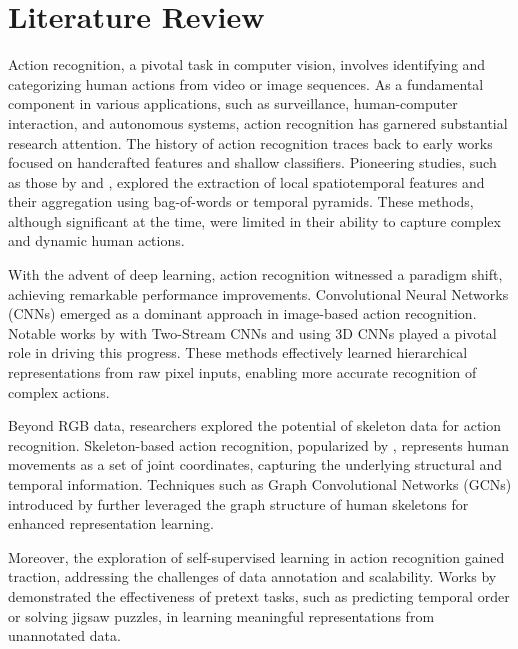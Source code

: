 \chapter{Literature Review}

Action recognition, a pivotal task in computer vision, involves identifying and categorizing human actions from video or image sequences. As a fundamental component in various applications, such as surveillance, human-computer interaction, and autonomous systems, action recognition has garnered substantial research attention. The history of action recognition traces back to early works focused on handcrafted features and shallow classifiers. Pioneering studies, such as those by \cite{laptev2008learning} and \cite{wang2009evaluation}, explored the extraction of local spatiotemporal features and their aggregation using bag-of-words or temporal pyramids. These methods, although significant at the time, were limited in their ability to capture complex and dynamic human actions.

With the advent of deep learning, action recognition witnessed a paradigm shift, achieving remarkable performance improvements. Convolutional Neural Networks (CNNs) emerged as a dominant approach in image-based action recognition. Notable works by \cite{simonyan2014very} with Two-Stream CNNs and \cite{carreira2017quo} using 3D CNNs played a pivotal role in driving this progress. These methods effectively learned hierarchical representations from raw pixel inputs, enabling more accurate recognition of complex actions.

Beyond RGB data, researchers explored the potential of skeleton data for action recognition. Skeleton-based action recognition, popularized by \cite{du2015skeleton}, represents human movements as a set of joint coordinates, capturing the underlying structural and temporal information. Techniques such as Graph Convolutional Networks (GCNs) introduced by \cite{yan2018spatial} further leveraged the graph structure of human skeletons for enhanced representation learning.

Moreover, the exploration of self-supervised learning in action recognition gained traction, addressing the challenges of data annotation and scalability. Works by \cite{misra2020self} demonstrated the effectiveness of pretext tasks, such as predicting temporal order or solving jigsaw puzzles, in learning meaningful representations from unannotated data.

